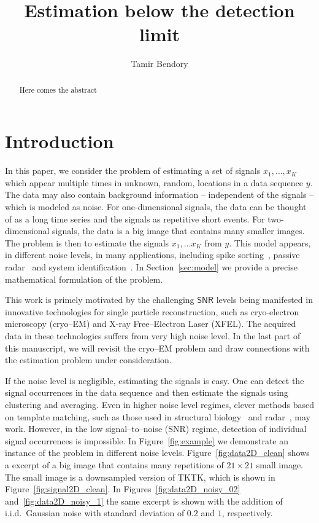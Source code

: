 \documentclass[english]{article}
\numberwithin{equation}{section}
\theoremstyle{plain}
\theoremstyle{definition}
\theoremstyle{remark}
\theoremstyle{plain}
\theoremstyle{remark}
\theoremstyle{plain}
\theoremstyle{plain}
\newcommand{\SNR}{{\textsf{SNR}}}
\begin{document}
\title{Estimation below the detection limit}


\author{Tamir Bendory}
\maketitle

\begin{abstract}
	Here comes the abstract
\end{abstract}

\section{Introduction}

In this paper, we consider the problem of estimating a set of signals $x_1,\ldots,x_K$ which appear multiple times in unknown, random, locations in a data sequence $y$. The data may also contain background information -- independent of the signals -- which is modeled as noise.
For one-dimensional signals, the data can be thought of as a long time series and the signals as repetitive short events. For two-dimensional signals, the data is a big image that contains many smaller images.  
The problem is then to estimate the signals $x_1,\ldots x_K$ from $y$. This
model appears, in different noise levels, in many applications, including spike sorting~\cite{lewicki1998review}, passive radar~\cite{gogineni2017passive} and system identification~\cite{ljung1998system}.
In Section~\ref{sec:model} we provide a precise mathematical formulation of the problem.

This work is primely motivated by the challenging $\SNR$ levels being manifested in  innovative technologies for single particle reconstruction, such as cryo-electron microscopy (cryo--EM) and X-ray Free--Electron Laser (XFEL). The acquired data in these technologies suffers from very high noise level.  In the last part of this manuscript, we will revisit the cryo--EM problem and draw connections with the estimation problem under consideration.

If the noise level is negligible, estimating the signals is easy.
One can detect the signal occurrences in the data sequence and then estimate the signals using clustering and averaging.
Even in higher noise level regimes, clever methods based on template matching, such as those used in structural biology~\cite{heimowitz2018apple} and radar~\cite{gogineni2017passive}, may work.
However, in the low signal--to--noise (\SNR) regime, detection of individual signal occurrences is impossible. In Figure~\ref{fig:example} we demonstrate an instance of the problem in different noise levels. Figure~\ref{fig:data2D_clean} shows a excerpt of a big image that contains many repetitions of $21\times 21$ small image. The small image is a downsampled version of TKTK, which is shown in Figure~\ref{fig:signal2D_clean}. In Figures~\ref{fig:data2D_noisy_02} and~\ref{fig:data2D_noisy_1} the same excerpt is shown with the addition of i.i.d.\ Gaussian noise with standard deviation of $0.2$ and $1$, respectively.  
\end{document}
